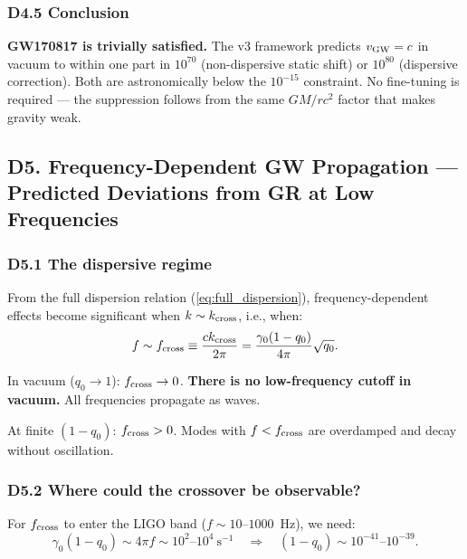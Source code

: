 \documentclass[reprint]{revtex4-2}
\begin{document}
\subsubsection{D4.5 Conclusion}

\textbf{GW170817 is trivially satisfied.} The v3 framework predicts $v_{\rm GW} = c$ in vacuum to within one part in $10^{70}$ (non-dispersive static shift) or $10^{80}$ (dispersive correction). Both are astronomically below the $10^{-15}$ constraint. No fine-tuning is required --- the suppression follows from the same $GM/rc^2$ factor that makes gravity weak.

\subsection{D5. Frequency-Dependent GW Propagation --- Predicted Deviations from GR at Low Frequencies}

\subsubsection{D5.1 The dispersive regime}

From the full dispersion relation (\ref{eq:full_dispersion}), frequency-dependent effects become significant when $k \sim k_{\rm cross}$, i.e., when:
\begin{equation}
f \sim f_{\rm cross} \equiv \frac{c k_{\rm cross}}{2\pi} = \frac{\gamma_0(1-q_0)}{4\pi}\sqrt{q_0}.
\end{equation}

In vacuum ($q_0 \to 1$): $f_{\rm cross} \to 0$. \textbf{There is no low-frequency cutoff in vacuum.} All frequencies propagate as waves.

At finite $(1-q_0)$: $f_{\rm cross} > 0$. Modes with $f < f_{\rm cross}$ are overdamped and decay without oscillation.

\subsubsection{D5.2 Where could the crossover be observable?}

For $f_{\rm cross}$ to enter the LIGO band ($f \sim 10$--$1000$~Hz), we need:
\begin{equation}
\gamma_0(1-q_0) \sim 4\pi f \sim 10^2\text{--}10^4~\text{s}^{-1} \quad\Longrightarrow\quad (1-q_0) \sim 10^{-41}\text{--}10^{-39}.
\end{equation}
\end{document}

